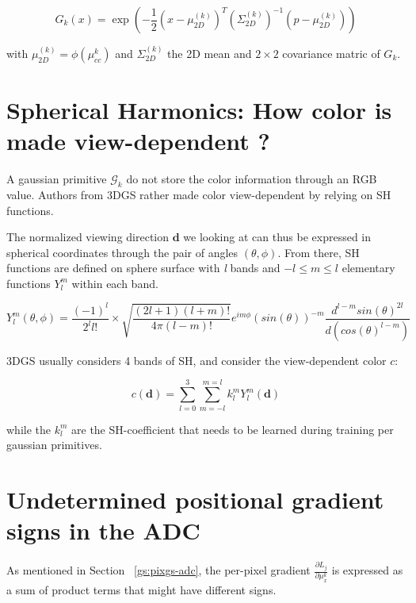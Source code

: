 \begin{equation}
    G_{k}(x) = \exp(-\frac{1}{2}(x-\mu^{(k)}_{2D})^{T}(\Sigma^{(k)}_{2D})^{-1}(p-\mu^{(k)}_{2D}))
\end{equation}

with $\mu^{(k)}_{2D}= \phi(\mu_{cc}^{k})$ and $\Sigma^{(k)}_{2D}$ the 2D mean and $2\times2$ covariance matric of $G_{k}$. 


\section{Spherical Harmonics: How color is made view-dependent ?}
\label{appendix:gs-sh}

A gaussian primitive $\mathcal{G}_{k}$ do not store the color information through an RGB value. Authors from 3D\ac{GS} rather made color view-dependent by relying on \ac{SH} functions. 

The normalized viewing direction $\mathbf{d}$ we looking at can thus be expressed in spherical coordinates through the pair of angles $(\theta,\phi)$. From there, \ac{SH} functions are defined on sphere surface with \textit{l} bands and $-l \leq  m \leq l$ elementary functions $Y_{l}^{m}$ within each band.

\begin{equation}
    Y_{l}^{m}(\theta,\phi) = \frac{(-1)^{l}}{2^{l}l!} \times \sqrt{\frac{(2l+1)(l+m)!}{4\pi(l-m)!}}e^{im\phi}(sin(\theta))^{-m}\frac{d^{l-m}sin(\theta)^{2l}}{d(cos(\theta)^{l-m})}
\end{equation}

3D\ac{GS} usually considers 4 bands of \ac{SH}, and consider the view-dependent color $c$: 

\begin{equation}
    c(\mathbf{d}) = \sum_{l=0}^{3}\sum_{m=-l}^{m=l}k_{l}^{m}Y_{l}^{m}(\mathbf{d})
\end{equation}

while the $k_{l}^{m}$ are the \ac{SH}-coefficient that needs to be learned during training per gaussian primitives. 

\section{Undetermined positional gradient signs in the ADC}
\label{appendix:sign-gradient}

As mentioned in Section ~\ref{gs:pixgs-adc}, the per-pixel gradient $\frac{\partial L_{j}}{\partial \mu^{k}_{x}}$ is expressed as a sum of product terms that might have different signs. 

